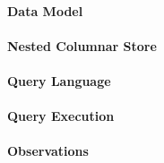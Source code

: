 \paragraph{Data Model}


\paragraph{Nested Columnar Store}

\paragraph{Query Language}

\paragraph{Query Execution}

\paragraph{Observations}



